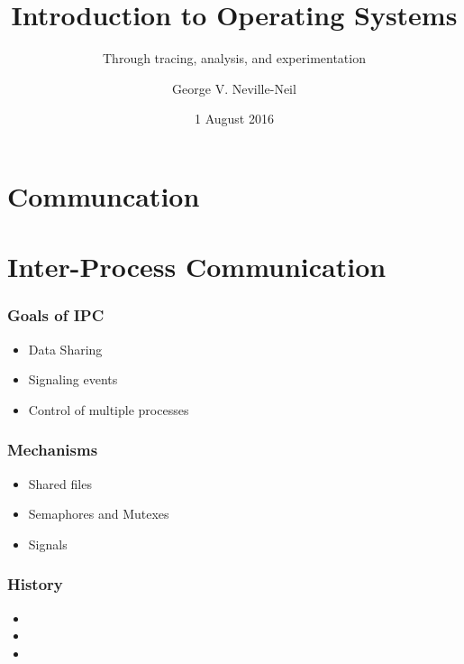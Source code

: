 
{
}

\usepackage[english]{babel}
\usepackage[latin1]{inputenc}
\usepackage{graphicx}
\usepackage{times}
\usepackage[T1]{fontenc}
\usepackage{fancyvrb}
\usepackage{listings}


\title{Introduction to Operating Systems}
\subtitle{Through tracing, analysis, and experimentation}
\author{George V. Neville-Neil}
\date{1 August 2016}

\begin{frame}
  \titlepage
\end{frame}

\section{Communcation}
\label{sec:communication}

\section{Inter-Process Communication}
\label{sec:ipc}

\begin{frame}
  \frametitle{Goals of IPC}
  \begin{itemize}
  \item Data Sharing
  \item Signaling events
  \item Control of multiple processes
  \end{itemize}
\end{frame}

\begin{frame}
  \frametitle{Mechanisms}
  \begin{itemize}
  \item Shared files
  \item Semaphores and Mutexes
  \item Signals
  \end{itemize}
\end{frame}

\begin{frame}
  \frametitle{History}
  \begin{itemize}
  \item 
  \item 
  \item 
  \end{itemize}
\end{frame}

